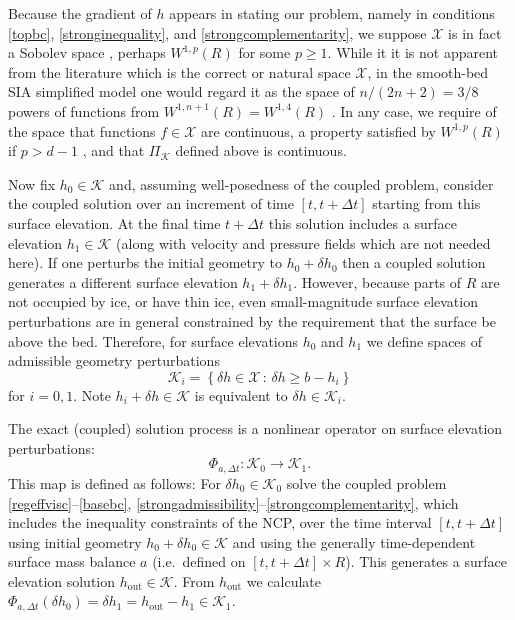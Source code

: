 \documentclass[letterpaper,final,12pt,reqno]{amsart}
\newcommand{\PiK}{\Pi_{\mathcal{K}}}
\newcommand{\hout}{h_{\text{out}}}
\begin{document}
Because the gradient of $h$ appears in stating our problem, namely in conditions \eqref{topbc}, \eqref{stronginequality}, and \eqref{strongcomplementarity}, we suppose $\mathcal{X}$ is in fact a Sobolev space \cite{Evans2010}, perhaps $W^{1,p}(R)$ for some $p\ge 1$.  While it it is not apparent from the literature which is the correct or natural space $\mathcal{X}$, in the smooth-bed SIA simplified model one would regard it as the space of $n/(2n+2) = 3/8$ powers of functions from $W^{1,n+1}(R)=W^{1,4}(R)$ \cite{JouvetBueler2012}.  In any case, we require of the space that functions $f\in \mathcal{X}$ are continuous, a property satisfied by $W^{1,p}(R)$ if $p>d-1$ \cite[theorem 5.6.5]{Evans2010}, and that $\PiK$ defined above is continuous.

Now fix $h_0 \in \mathcal{K}$ and, assuming well-posedness of the coupled problem, consider the coupled solution over an increment of time $[t,t+\Delta t]$ starting from this surface elevation.  At the final time $t+\Delta t$ this solution includes a surface elevation $h_1 \in \mathcal{K}$ (along with velocity and pressure fields which are not needed here).  If one perturbs the initial geometry to $h_0+\delta h_0$ then a coupled solution generates a different surface elevation $h_1+\delta h_1$.  However, because parts of $R$ are not occupied by ice, or have thin ice, even small-magnitude surface elevation perturbations are in general constrained by the requirement that the surface be above the bed.  Therefore, for surface elevations $h_0$ and $h_1$ we define spaces of admissible geometry perturbations
\begin{equation}
\mathcal{K}_i = \left\{\delta h \in \mathcal{X} \,:\, \delta h \ge b - h_i\right\}  \label{admissibleperturbations}
\end{equation}
for $i=0,1$.  Note $h_i+\delta h \in \mathcal{K}$ is equivalent to $\delta h \in \mathcal{K}_i$.

The exact (coupled) solution process is a nonlinear operator on surface elevation perturbations:
\begin{equation}
\Phi_{a,\Delta t} : \mathcal{K}_0 \to \mathcal{K}_1. \label{perturboperatorexact}
\end{equation}
This map is defined as follows: For $\delta h_0 \in \mathcal{K}_0$ solve the coupled problem \eqref{regeffvisc}--\eqref{basebc}, \eqref{strongadmissibility}--\eqref{strongcomplementarity}, which includes the inequality constraints of the NCP, over the time interval $[t,t+\Delta t]$ using initial geometry $h_0+\delta h_0 \in \mathcal{K}$ and using the generally time-dependent surface mass balance $a$ (i.e.~defined on $[t,t+\Delta t]\times R$).  This generates a surface elevation solution $\hout \in \mathcal{K}$.  From $\hout$ we calculate $\Phi_{a,\Delta t} (\delta h_0) = \delta h_1 = \hout - h_1 \in \mathcal{K}_1$.
\end{document}
